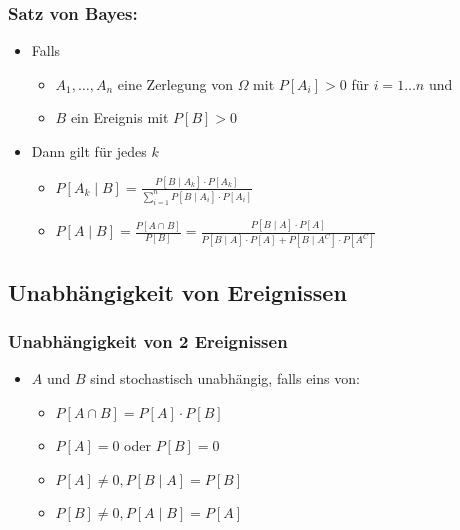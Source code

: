\subsubsection{Satz von Bayes:}
\begin{itemize}
    \item Falls
        \begin{itemize}
            \item $A_1,\dots, A_n$ eine Zerlegung von $\Omega$ mit $P[A_i] > 0$ für $i = 1 \dots n$ und
            \item $B$ ein Ereignis mit $P[B] > 0$
        \end{itemize}
    \item Dann gilt für jedes $k$
        \begin{itemize}
            \item $ P[A_k \mid B] = \frac{P[B \mid A_k]\cdot P[A_k]}{\sum_{i=1}^n P[B \mid A_i] \cdot P[A_i]}$
            \item $P[A\mid B] =
                \frac{P[A \cap B]}{P[B]} =
	            \frac{P[B\mid A]\cdot P[A]}{P[B\mid A]\cdot P[A] + P[B \mid A^C]\cdot P[A^C]}$
        \end{itemize}
\end{itemize}

\subsection{Unabhängigkeit von Ereignissen}
\subsubsection{Unabhängigkeit von 2 Ereignissen}
\begin{itemize}
    \item $A$ und $B$ sind stochastisch unabhängig, falls eins von:
        \begin{itemize}
            \item $P[A \cap B] = P[A] \cdot P[B]$
            \item $P[A]=0$ oder $P[B] = 0$
            \item $P[A] \neq 0, P[B \mid A] = P[B]$
            \item $P[B] \neq 0, P[A \mid B] = P[A]$
        \end{itemize}
\end{itemize}

